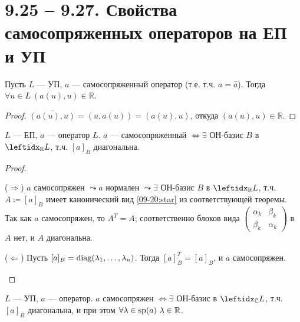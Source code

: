 \section*{9.25 -- 9.27. Свойства самосопряженных операторов на ЕП и УП}

\setcounter{thm}{0}

\begin{thm}
    Пусть $L$ --- УП, $a$ --- самосопряженный оператор (т.е. т.ч. $a = \hat{a}$). Тогда $\forall u \in L\ (a(u), u) \in \mathbb{R}$.
\end{thm}

\begin{proof}
    $\overline{(a(u), u)} = (u, a(u)) = (a(u), u)$, откуда $(a(u), u) \in \mathbb{R}$.
\end{proof}

\begin{thm}
    $L$ --- ЕП, $a$ --- оператор $L$. $a$ --- самосопряженный $\Leftrightarrow \exists$ ОН-базис $B$ в $\lsub{\mathbb{R}}{L}$, т.ч. $[a]_B$ диагональна.
\end{thm}

\begin{proof}
    \begin{proofpart}{($\Rightarrow$)}
        $a$ самосопряжен $\leadsto a$ нормален $\leadsto \exists$ ОН-базис $B$ в $\lsub{\mathbb{R}}{L}$, т.ч. $A \coloneqq [a]_B$ имеет канонический вид \eqref{09-20:star} из соответствующей теоремы. Так как $a$ самосопряжен, то $A^T = A$; соответственно блоков вида $\begin{pmatrix}
            \alpha_k & \beta_k \\
            \beta_k  & \alpha_k
        \end{pmatrix}$ в $A$ нет, и $A$ диагональна.
    \end{proofpart}

    \begin{proofpart}{($\Leftarrow$)}
        Пусть $[a]_B = \operatorname{diag}(\lambda_1, \dots, \lambda_n)$. Тогда $[a]_B^T = [a]_B$, и $a$ самосопряжен.
    \end{proofpart}
\end{proof}

\begin{thm}
    $L$ --- УП, $a$ --- оператор. $a$ самосопряжен $\Leftrightarrow \exists$ ОН-базис в $\lsub{\mathbb{C}}{L}$, т.ч. $[a]_B$ диагональна, и при этом $\forall \lambda \in \operatorname{sp}(a)\ \lambda \in \mathbb{R}$.
\end{thm}


